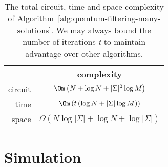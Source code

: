 \begin{table}[h!]
	\centering
	\begin{tabular}{| r || c |}
		\hline
		\quad            & complexity \\
		\hline\hline
		circuit           & $\Om\left(N + \log N + \vert \Sigma \vert^2\log M \right)$\\
		\hline
		time             & $\Om\left( t\left(\log N + \vert \Sigma \vert\log M \right)\right)$\\
		\hline
		space           & $\Omega\left( N\log\vert \Sigma \vert + \log N + \log \vert \Sigma \vert \right)$\\
		\hline
	\end{tabular}
	\caption{The total circuit, time and space complexity of Algorithm~\ref{alg:quantum-filtering-many-solutions}. We may always bound the number of iterations \textit{t} to maintain advantage over other algorithms.}
	\label{tab:quantum-filtering-verification-complexity-multiple-solutions}
\end{table}



\section{Simulation}
